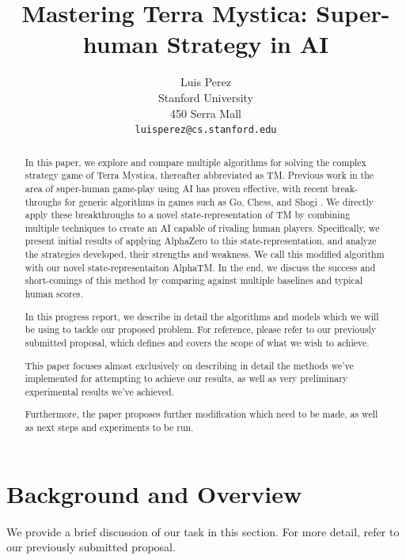 \documentclass[12pt,twocolumn,letterpaper]{article}
\begin{document}
\title{Mastering Terra Mystica: Super-human Strategy in AI}

\author{
Luis Perez\\
Stanford University\\
450 Serra Mall\\
{\tt\small luisperez@cs.stanford.edu}
}

\maketitle
\thispagestyle{empty}

\begin{abstract}
In this paper, we explore and compare multiple algorithms for solving the complex strategy game of Terra Mystica, thereafter abbreviated as TM. Previous work in the area of super-human game-play using AI has proven effective, with recent break-throughs for generic algorithms in games such as Go, Chess, and Shogi \cite{AlphaZero}. We directly apply these breakthroughs to a novel state-representation of TM by combining multiple techniques to create an AI capable of rivaling human players. Specifically, we present initial results of applying AlphaZero to this state-representation, and analyze the strategies developed, their strengths and weakness. We call this modified algorithm with our novel state-representaiton AlphaTM. In the end, we discuss the success and short-comings of this method by comparing against multiple baselines and typical human scores.

In this progress report, we describe in detail the algorithms and models which we will be using to tackle our proposed problem. For reference, please refer to our previously submitted proposal, which defines and covers the scope of what we wish to achieve.

This paper focuses almost exclusively on describing in detail the methods we've implemented for attempting to achieve our results, as well as very preliminary experimental results we've achieved.

Furthermore, the paper proposes further modification which need to be made, as well as next steps and experiments to be run.
\end{abstract}

\section{Background and Overview}
\label{section:background_and_overview}
We provide a brief discussion of our task in this section. For more detail, refer to our previously submitted proposal.
\end{document}
